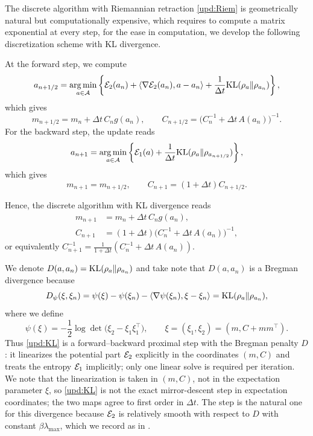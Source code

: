 The discrete algorithm with Riemannian retraction \eqref{upd:Riem} is geometrically natural but
computationally expensive, which requires to compute a matrix exponential at every step, for
the ease in computation, we develop the following discretization scheme with KL divergence.

At the forward step, we compute
\begin{equation*}
    a_{n+1/2}
    =
    \operatorname*{arg\,min}_{a\in\mathcal{A}}
    \left\{
        \mathcal{E}_2(a_n)+\left\langle \nabla\mathcal{E}_2(a_n),a-a_n\right\rangle+\frac1{\Delta t}\mathrm{KL}(\rho_a\|\rho_{a_n})
    \right\},
\end{equation*}
which gives
\begin{equation*}
    m_{n+1/2}=m_n+\Delta t\,C_ng(a_n),
    \qquad
    C_{n+1/2}=\bigl(C_n^{-1}+\Delta t\,A(a_n)\bigr)^{-1}.
\end{equation*}
For the backward step, the update reads
\begin{equation*}
    a_{n+1}
    =
    \operatorname*{arg\,min}_{a\in\mathcal{A}}
    \left\{\mathcal{E}_1(a)+\frac1{\Delta t}\mathrm{KL}(\rho_a\|\rho_{a_{n+1/2}})\right\},
\end{equation*}
which gives
\begin{equation*}
    m_{n+1}=m_{n+1/2},
    \qquad
    C_{n+1}=(1+\Delta t)C_{n+1/2}.
\end{equation*}

Hence, the discrete algorithm with KL divergence reads
\begin{equation}\label{upd:KL}
    \boxed{
    \begin{aligned}
        m_{n+1} &= m_n+\Delta t\,C_ng(a_n), \\
        C_{n+1} &= (1+\Delta t)\bigl(C_n^{-1}+\Delta t\,A(a_n)\bigr)^{-1},
    \end{aligned}}
\end{equation}
or equivalently $C_{n+1}^{-1}=\tfrac1{1+\Delta t}(C_n^{-1}+\Delta t\,A(a_n))$.

We denote $D(a,a_n)=\mathrm{KL}(\rho_a\|\rho_{a_n})$ and take note that $D(a,a_n)$ is a Bregman
divergence because
\begin{equation}\label{eq:Bregman}
    D_\psi(\xi,\xi_n)
    =\psi(\xi)-\psi(\xi_n)-\left\langle \nabla\psi(\xi_n),\xi-\xi_n\right\rangle
    =\mathrm{KL}(\rho_a\|\rho_{a_n}),
\end{equation}
where we define
\begin{equation}\label{eq:Bregman-potential}
    \psi(\xi)=-\frac12\log\det\bigl(\xi_2-\xi_1\xi_1^\top\bigr),
    \qquad
    \xi=(\xi_1,\xi_2)=(m,C+mm^\top).
\end{equation}
Thus \eqref{upd:KL} is a forward--backward proximal step with the Bregman penalty $D$: it
linearizes the potential part $\mathcal{E}_2$ explicitly in the coordinates $(m,C)$ and treats the
entropy $\mathcal{E}_1$ implicitly; only one linear solve is required per iteration. We note that
the linearization is taken in $(m,C)$, not in the expectation parameter $\xi$, so
\eqref{upd:KL} is not the exact mirror-descent step in expectation coordinates; the two maps
agree to first order in $\Delta t$. The step is the natural one for
this divergence because $\mathcal{E}_2$ is relatively smooth with respect to $D$ with constant
$\beta\lambda_{\max}$, which we record as  in .

